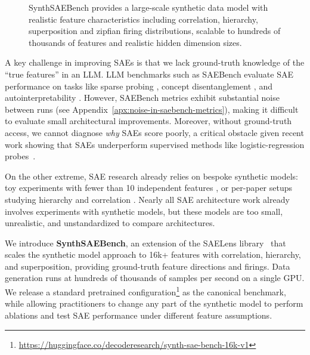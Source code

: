 \documentclass{article}
\theoremstyle{plain}
\theoremstyle{definition}
\theoremstyle{remark}
\begin{document}
\begin{figure}[!t]
\centering
\resizebox{\columnwidth}{!}{%

}
\caption{SynthSAEBench provides a large-scale synthetic data model with realistic feature characteristics including correlation, hierarchy, superposition and zipfian firing distributions, scalable to hundreds of thousands of features and realistic hidden dimension sizes.}
\label{fig:overview}
\end{figure}

A key challenge in improving SAEs is that we lack ground-truth knowledge of the ``true features'' in an LLM. LLM benchmarks such as SAEBench \citep{karvonen2025saebenchcomprehensivebenchmarksparse} evaluate SAE performance on tasks like sparse probing \citep{gurnee2023finding,kantamneni2025sparse}, concept disentanglement \citep{karvonen2024evaluating}, and autointerpretability \citep{paulo2025automatically}. However, SAEBench metrics exhibit substantial noise between runs (see Appendix~\ref{apx:noise-in-saebench-metrics}), making it difficult to evaluate small architectural improvements. Moreover, without ground-truth access, we cannot diagnose \emph{why} SAEs score poorly, a critical obstacle given recent work showing that SAEs underperform supervised methods like logistic-regression probes~\citep{kantamneni2025sparse}.

On the other extreme, SAE research already relies on bespoke synthetic models: toy experiments with fewer than 10 independent features \citep{song2025position,Gribonval2010Dictionary,elhage2022toy}, or per-paper setups studying hierarchy \citep{chanin2025a,costa2025flat,bussmann2025learning} and correlation \citep{chanin2025feature,chanin2025sparse}. Nearly all SAE architecture work already involves experiments with synthetic models, but these models are too small, unrealistic, and unstandardized to compare architectures.

We introduce \textbf{SynthSAEBench}, an extension of the SAELens library~\citep{bloom2024saetrainingcodebase} that scales the synthetic model approach to 16k+ features with correlation, hierarchy, and superposition, providing ground-truth feature directions and firings. Data generation runs at hundreds of thousands of samples per second on a single GPU. We release a standard pretrained configuration\footnote{\url{https://huggingface.co/decoderesearch/synth-sae-bench-16k-v1}}
 as the canonical benchmark, while allowing practitioners to change any part of the synthetic model to perform ablations and test SAE performance under different feature assumptions.
\end{document}
